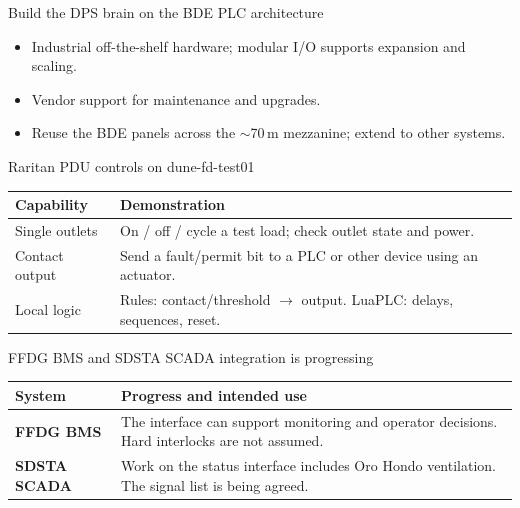 \documentclass[aspectratio=169,11pt]{beamer}
\begin{document}
\begin{frame}{Build the DPS brain on the BDE PLC architecture}
\begin{itemize}
\item Industrial off-the-shelf hardware; modular I/O supports expansion and scaling.
\item Vendor support for maintenance and upgrades.
\item Reuse the BDE panels across the $\sim$70\,m mezzanine; extend to other systems.
\end{itemize}\par\medskip
\centering
{}\par\smallskip
\raggedright{}
\end{frame}

\begin{frame}{Raritan PDU controls on dune-fd-test01}
\centering
{}\par\smallskip
\raggedright
\renewcommand{\arraystretch}{1.12}
\begin{tabularx}{\textwidth}{@{}>{\RaggedRight\arraybackslash}p{2.8cm}>{\RaggedRight\arraybackslash}X@{}}
\toprule
\textbf{Capability} & \textbf{Demonstration}\\\midrule
Single outlets & On / off / cycle a test load; check outlet state and power.\\
Contact output & Send a fault/permit bit to a PLC or other device using an actuator.\\
Local logic & Rules: contact/threshold $\rightarrow$ output. LuaPLC: delays, sequences, reset.\\
\bottomrule
\end{tabularx}\par\smallskip
\end{frame}

\begin{frame}{FFDG BMS and SDSTA SCADA integration is progressing}
\renewcommand{\arraystretch}{1.6}
\begin{tabularx}{\textwidth}{@{}>{\RaggedRight\arraybackslash}p{3.2cm}>{\RaggedRight\arraybackslash}X@{}}
\toprule
\textbf{System} & \textbf{Progress and intended use}\\\midrule
\textbf{FFDG BMS} & The interface can support monitoring and operator decisions. Hard interlocks are not assumed.\\[1.5ex]
\textbf{SDSTA SCADA} & Work on the status interface includes Oro Hondo ventilation. The signal list is being agreed.\\
\bottomrule
\end{tabularx}
\end{frame}
\end{document}
